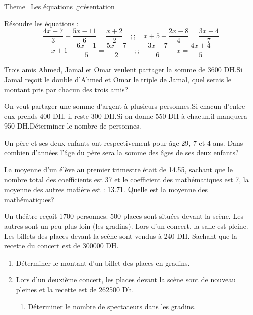 \documentclass[a4paper,12pt]{article}
\begin{document}
\begin{Maquette}[Fiche]{Theme=Les équations ,présentation}
\begin{exercice}
Résoudre les équations :
\[
\dfrac{4x-7}{3}+\dfrac{5x-11}{6}=\dfrac{x+2}{2}\quad ;; \quad
x+5+\dfrac{2x-8}{4}=\dfrac{3x-4}{7}
\]
\[
x+1+\dfrac{6x-1}{5}=\dfrac{5x-7}{2}\quad ;; \quad
\dfrac{3x-7}{6}-x=\dfrac{4x+4}{5}
\]
\end{exercice}
\begin{exercice}
Trois amis Ahmed, Jamal et Omar veulent partager la somme de 3600 DH.Si Jamal reçoit le double d'Ahmed et Omar le triple de Jamal, quel serais le montant pris par chacun des trois amis?
\end{exercice}
\begin{exercice}
On veut partager une somme d'argent à plusieurs personnes.Si chacun d'entre eux prends 400 DH, il reste 300 DH.Si on donne 550 DH à chacun,il manquera 950 DH.Déterminer le nombre de personnes.
\end{exercice}
\begin{exercice}
Un père et ses deux enfants ont respectivement pour âge 29, 7 et 4 ans.
Dans combien d'années l'âge du père sera la somme des âges de ses deux enfants?
\end{exercice}
\begin{exercice}
La moyenne d'un élève au premier trimestre était de 14.55, sachant que le nombre total des coefficients est 37 et le coefficient des mathématiques est 7, la moyenne des autres matière est : 13.71.
Quelle est la moyenne des mathématiques?
\end{exercice}
\begin{exercice}
Un théâtre reçoit 1700 personnes. 500 places sont situées devant la scène. Les autres sont un peu plus loin (les gradins).
Lors d'un concert, la salle est pleine. Les billets des places devant la scène sont vendus à 240 DH. Sachant que la recette du concert est de 300000 DH.
\begin{enumerate}
\item Déterminer le montant d'un billet des places en gradins.
\item Lors d'un deuxième concert, les places devant la scène sont de nouveau pleines et la recette est de 262500 Dh.
\begin{enumerate}
\item Déterminer le nombre de spectateurs dans les gradins. 
\end{enumerate}
\end{enumerate}
\end{exercice}
\end{Maquette}
\end{document}
